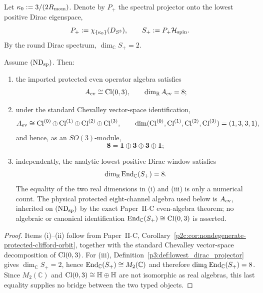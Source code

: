 \documentclass[12pt,a4paper]{article}
\begin{document}
\begin{definition}
\label{p3:def:lowest_dirac_projector}
Let \(\kappa_0:=3/(2R_{\mathrm{mom}})\).  Denote by \(P_+\) the spectral projector onto
the lowest positive Dirac eigenspace,
\[
 P_+:=\chi_{\{\kappa_0\}}(D_{S^3}),
 \qquad
 S_+:=P_+\mathcal H_{\rm spin}.
\]
By the round Dirac spectrum, \(\dim_{\mathbb C}S_+=2\).
\end{definition}

\begin{theorem}
\label{p3:thm:8mode_operator_basis}
Assume \((\mathrm{ND}_{\rm sp})\).  Then:
\begin{enumerate}
\item the imported protected even operator algebra satisfies
\[
 A_{\rm ev}\cong\operatorname{Cl}(0,3),
 \qquad
 \dim_{\mathbb R}A_{\rm ev}=8;
\]
\item under the standard Chevalley vector-space identification,
\[
 A_{\rm ev}
 \cong
 \operatorname{Cl}^{(0)}\oplus\operatorname{Cl}^{(1)}\oplus\operatorname{Cl}^{(2)}\oplus\operatorname{Cl}^{(3)},
 \qquad
 \dim(\operatorname{Cl}^{(0)},\operatorname{Cl}^{(1)},\operatorname{Cl}^{(2)},\operatorname{Cl}^{(3)})=(1,3,3,1),
\]
and hence, as an \(SO(3)\)-module,
\[
 \mathbf 8=\mathbf1\oplus\mathbf3\oplus\mathbf3\oplus\mathbf1;
\]
\item independently, the analytic lowest positive Dirac window satisfies
\[
 \dim_{\mathbb R}\operatorname{End}_{\mathbb C}(S_+)=8.
\]
The equality of the two real dimensions in (i) and (iii) is only a numerical
count.  The physical protected eight-channel algebra used below is
\(A_{\rm ev}\), inherited on \((\mathrm{ND}_{\rm sp})\) by the exact
Paper~II-C even-algebra theorem; no algebraic or
canonical identification
\(\operatorname{End}_{\mathbb C}(S_+)\cong\operatorname{Cl}(0,3)\) is asserted.
\end{enumerate}
\end{theorem}

\begin{proof}
Items (i)--(ii) follow from Paper~II-C,
Corollary~\ref{p2c:cor:nondegenerate-protected-clifford-orbit}, together with the standard
Chevalley vector-space decomposition of \(\operatorname{Cl}(0,3)\)\cite{lawson1989spin}.
For (iii), Definition~\ref{p3:def:lowest_dirac_projector} gives
\(\dim_{\mathbb C}S_+=2\), hence
\(\operatorname{End}_{\mathbb C}(S_+)\cong M_2(\mathbb C)\) and therefore
\(\dim_{\mathbb R}\operatorname{End}_{\mathbb C}(S_+)=8\).  Since
\(M_2(\mathbb C)\) and \(\operatorname{Cl}(0,3)\cong\mathbb H\oplus\mathbb H\) are not
isomorphic as real algebras, this last equality supplies no bridge between
the two typed objects.
\end{proof}
\end{document}
